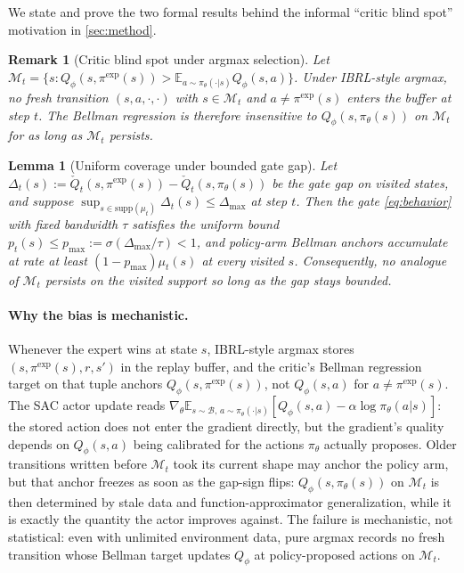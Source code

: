 \documentclass{article}
\newtheorem{lemma}{Lemma}
\newtheorem{remark}{Remark}
\begin{document}
We state and prove the two formal results behind the informal
``critic blind spot'' motivation in \cref{sec:method}.

\begin{remark}[Critic blind spot under argmax selection]
\label{rem:blindspot}
Let $\mathcal{M}_t = \{s : Q_\phi(s,\pi^{\mathrm{exp}}(s)) > \mathbb{E}_{a\sim
\pi_\theta(\cdot|s)} Q_\phi(s,a)\}$. Under IBRL-style argmax, no
fresh transition $(s, a, \cdot, \cdot)$ with $s\in\mathcal{M}_t$ and
$a\neq\pi^{\mathrm{exp}}(s)$ enters the buffer at step $t$. The Bellman regression
is therefore insensitive to $Q_\phi(s, \pi_\theta(s))$ on
$\mathcal{M}_t$ for as long as $\mathcal{M}_t$ persists.
\end{remark}

\begin{lemma}[Uniform coverage under bounded gate gap]
\label{lem:coverage}
Let $\Delta_t(s) := \check{Q}_t(s,\pi^{\mathrm{exp}}(s)) - \check{Q}_t(s,
\pi_\theta(s))$ be the gate gap on visited states, and suppose
$\sup_{s\in\mathrm{supp}(\mu_t)}\Delta_t(s) \le \Delta_{\max}$ at
step $t$. Then the gate \eqref{eq:behavior} with fixed bandwidth
$\tau$ satisfies the \emph{uniform} bound $p_t(s) \le p_{\max} :=
\sigma(\Delta_{\max}/\tau) < 1$, and policy-arm Bellman anchors
accumulate at rate at least $(1 - p_{\max})\mu_t(s)$ at every
visited $s$. Consequently, no analogue of $\mathcal{M}_t$ persists
on the visited support so long as the gap stays bounded.
\end{lemma}

\paragraph{Why the bias is mechanistic.} Whenever the expert wins at
state $s$, IBRL-style argmax stores $(s, \pi^{\mathrm{exp}}(s), r, s')$ in the
replay buffer, and the critic's Bellman regression target on that
tuple anchors $Q_\phi(s, \pi^{\mathrm{exp}}(s))$, not $Q_\phi(s, a)$ for
$a \neq \pi^{\mathrm{exp}}(s)$. The SAC actor update reads
$\nabla_\theta \mathbb{E}_{s \sim \mathcal{B},\, a \sim \pi_\theta(\cdot
| s)}[Q_\phi(s, a) - \alpha \log \pi_\theta(a|s)]$: the stored action
does not enter the gradient directly, but the gradient's quality
depends on $Q_\phi(s, a)$ being calibrated for the actions
$\pi_\theta$ actually proposes. Older transitions written before
$\mathcal{M}_t$ took its current shape may anchor the policy arm,
but that anchor freezes as soon as the gap-sign flips:
$Q_\phi(s, \pi_\theta(s))$ on $\mathcal{M}_t$ is then determined by
stale data and function-approximator generalization, while it is
exactly the quantity the actor improves against. The failure is
mechanistic, not statistical: even with unlimited environment data,
pure argmax records no fresh transition whose Bellman target updates
$Q_\phi$ at policy-proposed actions on $\mathcal{M}_t$.
\end{document}
